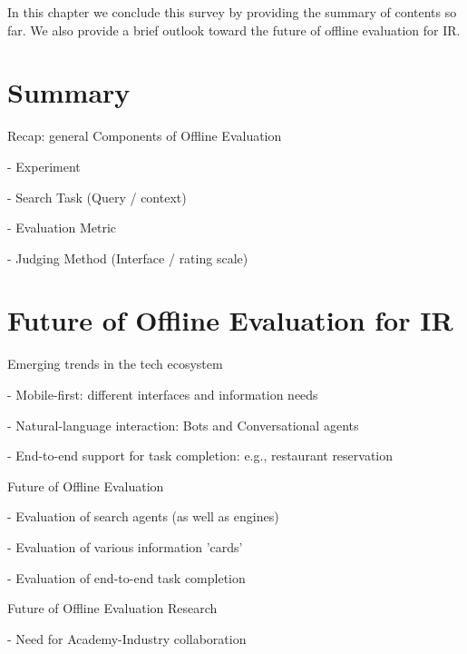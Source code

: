 \documentclass[openany]{now} %
\newcommand{\newpar}{\bigskip\noindent}
\begin{document}
In this chapter we conclude this survey by providing the summary of contents so far. 
We also provide a brief outlook toward the future of offline evaluation for IR.

\section{Summary}

Recap: general Components of Offline Evaluation

-	Experiment

-	Search Task (Query / context)

-	Evaluation Metric

-	Judging Method (Interface / rating scale) 


\section{Future of Offline Evaluation for IR}

Emerging trends in the tech ecosystem

- Mobile-first: different interfaces and information needs

- Natural-language interaction: Bots and Conversational agents

- End-to-end support for task completion: e.g., restaurant reservation 

\newpar
Future of Offline Evaluation

- Evaluation of search agents (as well as engines)

- Evaluation of various information 'cards'

- Evaluation of end-to-end task completion

\newpar
Future of Offline Evaluation Research

- Need for Academy-Industry collaboration

\backmatter  %



	
\end{document}
